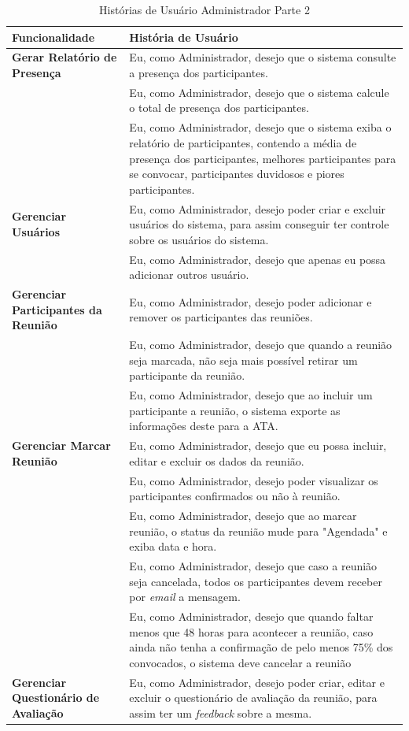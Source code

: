 \begin{table}[H]
	\begin{tabular}{|p{4.0cm}|p{11.0cm}|} 
	\hline
	\textbf{Funcionalidade} & \textbf{História de Usuário} \\ \hline
	\textbf{Gerar Relatório de Presença} & Eu, como Administrador, desejo que o sistema consulte a presença dos participantes. \\ \hline
	& Eu, como Administrador, desejo que o sistema calcule o total de presença dos participantes. \\ \hline
	& Eu, como Administrador, desejo que o sistema exiba o relatório de participantes, contendo a média de presença dos participantes, melhores participantes para se convocar, participantes duvidosos e piores participantes. \\ \hline
	\textbf{Gerenciar Usuários} & Eu, como Administrador, desejo poder criar e excluir usuários do sistema, para assim conseguir ter controle sobre os usuários do sistema. \\ \hline
	& Eu, como Administrador, desejo que apenas eu possa adicionar outros usuário. \\ \hline
	\textbf{Gerenciar Participantes da Reunião} &  Eu, como Administrador, desejo poder adicionar e remover os participantes das reuniões. \\ \hline
	& Eu, como Administrador, desejo que quando a reunião seja marcada, não seja mais possível retirar um participante da reunião. \\ \hline
	& Eu, como Administrador, desejo que ao incluir um participante a reunião, o sistema exporte as informações deste para a ATA. \\ \hline
	\textbf{Gerenciar Marcar Reunião} & Eu, como Administrador, desejo que eu possa incluir, editar e excluir os dados da reunião. \\ \hline
	& Eu, como Administrador, desejo poder visualizar os participantes confirmados ou não à reunião. \\ \hline
	& Eu, como Administrador, desejo que ao marcar reunião, o status da reunião mude para "Agendada" e exiba data e hora. \\ \hline
	& Eu, como Administrador, desejo que caso a reunião seja cancelada, todos os participantes devem receber por \textit{email} a mensagem. \\ \hline
	& Eu, como Administrador, desejo que quando faltar menos que 48 horas para acontecer a reunião, caso ainda não tenha a confirmação de pelo menos 75\% dos convocados, o sistema deve cancelar a reunião \\ \hline
	\textbf{Gerenciar Questionário de Avaliação} & Eu, como Administrador, desejo poder criar, editar e excluir o questionário de avaliação da reunião, para assim ter um \textit{feedback} sobre a mesma. \\ \hline 
	\end{tabular}
	 \caption{Histórias de Usuário Administrador Parte 2}
	 \label{tab:historias_de_usuario_administrador_parte2}
\end{table}


